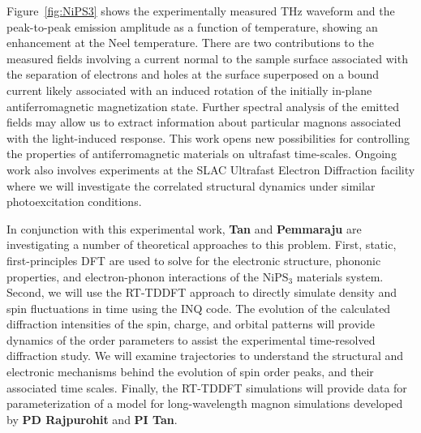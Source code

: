 Figure~\ref{fig:NiPS3} shows the experimentally measured THz waveform and the peak-to-peak emission amplitude as a function of temperature, showing an enhancement at the Neel temperature.
There are two contributions to the measured fields involving a current normal to the sample surface associated with the separation of electrons and holes at the surface superposed on a bound current likely associated with an induced rotation of the initially in-plane antiferromagnetic magnetization state.
Further spectral analysis of the emitted fields may allow us to extract information about particular magnons associated with the light-induced response.
This work opens new possibilities for controlling the properties of antiferromagnetic materials on ultrafast time-scales. 
Ongoing work also involves experiments at the SLAC Ultrafast Electron Diffraction facility where we will investigate the correlated structural dynamics under similar photoexcitation conditions.

In conjunction with this experimental work, {\bf Tan} and {\bf Pemmaraju} are investigating a number of theoretical approaches to this problem.
First, static, first-principles DFT are used to solve for the electronic structure, phononic properties, and electron-phonon interactions of the \(\mathrm{NiPS_3}\) materials system. 
Second, we will use the RT-TDDFT approach to directly simulate density and spin fluctuations in time using the \textsc{INQ} code.
The evolution of the calculated diffraction intensities of the spin, charge, and orbital patterns will provide dynamics of the order parameters to assist the experimental time-resolved diffraction study.
We will examine trajectories to understand the structural and electronic mechanisms behind the evolution of spin order peaks, and their associated time scales. 
Finally, the RT-TDDFT simulations will provide data for parameterization of a model for long-wavelength magnon simulations developed by \textbf{PD Rajpurohit} and \textbf{PI Tan}. 

